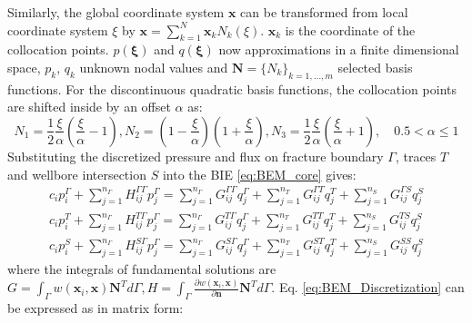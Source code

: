 \documentclass[num-refs]{wiley-networks}
\begin{document}
Similarly, the global coordinate system $\mathbf{x}$ can be transformed from local coordinate system $\xi$ by $\mathbf{x}=\sum_{k=1}^N \mathbf{x}_k N_k(\xi)$. $\mathbf{x}_k$ is the coordinate of the collocation points. $p(\mathbf{\xi})$ and $q(\mathbf{\xi})$ now approximations in a finite dimensional space, $p_{k}$, $q_{k}$ unknown nodal values and $\mathbf{N}=\{N_k\}_{k=1,\ldots,m}$ selected basis functions. For the discontinuous quadratic basis functions, the collocation points are shifted inside by an offset $\alpha$ as:
\begin{equation}
    N_1=\frac{1}{2}\frac{\xi}{\alpha}\left( \frac{\xi}{\alpha}-1 \right) , N_2=\left( 1-\frac{\xi}{\alpha} \right) \left( 1+\frac{\xi}{\alpha} \right) , N_3=\frac{1}{2}\frac{\xi}{\alpha}\left( \frac{\xi}{\alpha}+1 \right)
    ,\quad 0.5 < \alpha \leqslant 1
\end{equation}
Substituting the discretized pressure and flux on fracture boundary $\Gamma$, traces $T$ and wellbore intersection $S$ into the BIE \eqref{eq:BEM_core} gives:
\begin{eqnarray}
    c_ip_{i}^{\Gamma}+\sum_{j=1}^{n_{\Gamma}}{H_{ij}^{\Gamma \Gamma}p_{j}^{\Gamma}}=\sum_{j=1}^{n_{\Gamma}}{G_{ij}^{\Gamma \Gamma}q_{j}^{\Gamma}}+\sum_{j=1}^{n_T}{G_{ij}^{\Gamma T}q_{j}^{T}}+\sum_{j=1}^{n_S}{G_{ij}^{\Gamma S}q_{j}^{S}}
    \\
    c_ip_{i}^{T}+\sum_{j=1}^{n_{\Gamma}}{H_{ij}^{T\Gamma}p_{j}^{\Gamma}}=\sum_{j=1}^{n_{\Gamma}}{G_{ij}^{T\Gamma}q_{j}^{\Gamma}}+\sum_{j=1}^{n_T}{G_{ij}^{TT}q_{j}^{T}}+\sum_{j=1}^{n_S}{G_{ij}^{TS}q_{j}^{S}}
    \\
    c_ip_{i}^{S}+\sum_{j=1}^{n_{\Gamma}}{H_{ij}^{S\Gamma}p_{j}^{\Gamma}}=\sum_{j=1}^{n_{\Gamma}}{G_{ij}^{S\Gamma}q_{j}^{\Gamma}}+\sum_{j=1}^{n_T}{G_{ij}^{ST}q_{j}^{T}}+\sum_{j=1}^{n_S}{G_{ij}^{SS}q_{j}^{S}}
\label{eq:BEM_Discretization}
\end{eqnarray}
where the integrals of fundamental solutions are $G=\int_{\Gamma}{w\left( \mathbf{x}_i,\mathbf{x} \right)}\mathbf{N}^Td\Gamma ,H=\int_{\Gamma}{\frac{\partial w\left( \mathbf{x}_i,\mathbf{x} \right)}{\partial \mathbf{n}}}\mathbf{N}^Td\Gamma$. Eq. \eqref{eq:BEM_Discretization} can be expressed as in matrix form:
\end{document}
